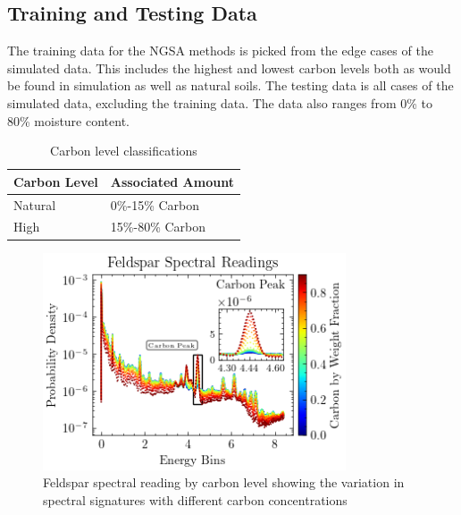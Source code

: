 \subsection{Training and Testing Data}

The training data for the NGSA methods is picked from the edge cases of the simulated data. This includes the highest and lowest carbon levels both as would be found in simulation as well as natural soils. The testing data is all cases of the simulated data, excluding the training data. The data also ranges from 0\% to 80\% moisture content.

\begin{table}[H]
\centering
\caption{Carbon level classifications}
\label{tab:carbon_levels}
\begin{tabular}{ll}
\toprule
Carbon Level & Associated Amount \\
\midrule
Natural & 0\%-15\% Carbon \\
High & 15\%-80\% Carbon \\
\bottomrule
\end{tabular}
\end{table}

\begin{figure}[H]
\centering
\includegraphics[width=0.8\textwidth]{../Figures/DataGeneration/FeldsparSpectralReadingByCarbonLevel.png}
\caption{Feldspar spectral reading by carbon level showing the variation in spectral signatures with different carbon concentrations}
\label{fig:feldspar_carbon}
\end{figure}